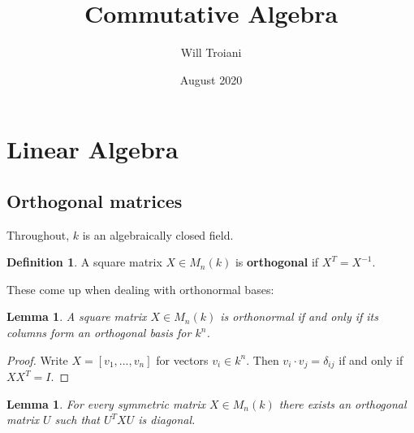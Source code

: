 \documentclass[12pt]{article}
\title{Commutative Algebra}
\author{Will Troiani}
\date{August 2020}
\theoremstyle{plain}
\newtheorem{lemma}[thm]{Lemma}
\theoremstyle{definition}
\newtheorem{defn}[thm]{Definition} %
\begin{document}
\maketitle
\tableofcontents

\section{Linear Algebra}
\subsection{Orthogonal matrices}
Throughout, $k$ is an algebraically closed field.
\begin{defn}
A square matrix $X \in M_n(k)$ is \textbf{orthogonal} if $X^T = X^{-1}$.
\end{defn}
These come up when dealing with orthonormal bases:
\begin{lemma}
\label{lem:orthonormal} A square matrix $X \in M_n(k)$ is orthonormal if and only if its columns form an orthogonal basis for $k^n$.
\end{lemma}
\begin{proof}
Write $X = [v_1, ..., v_n]$ for vectors $v_i \in k^n$. Then $v_i\cdot v_j = \delta_{ij}$ if and only if $XX^T = I$.
\end{proof}
\begin{lemma}
\label{lem:symm_diag} For every symmetric matrix $X \in M_n(k)$ there exists an orthogonal matrix $U$ such that $U^TXU$ is diagonal.
\end{lemma}
\end{document}
